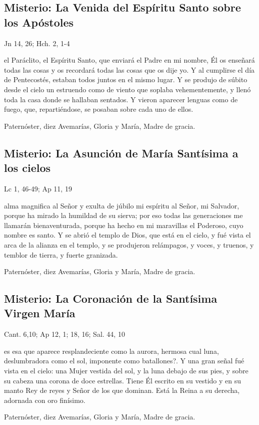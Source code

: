 \documentclass[./main.tex]{subfiles}
\newcounter{glorious-counter}
\begin{document}
\subsection*{ Misterio: La Venida del Espíritu Santo sobre los Apóstoles}
\begin{flushright}
      {\color{red}Jn 14, 26; Hch. 2, 1-4}
\end{flushright}
 el Paráclito, el Espíritu Santo, que enviará el Padre en mi nombre, Él os enseñará todas las cosas y os recordará todas las cosas que os dije yo. 
Y al cumplirse el día de Pentecostés, estaban todos juntos en el mismo lugar. Y se produjo de súbito desde el cielo un estruendo como de viento que soplaba vehementemente, 
y llenó toda la casa donde se hallaban sentados. Y vieron aparecer lenguas como de fuego, que, repartiéndose, se posaban sobre cada uno de ellos.

\begin{center}
      Paternóster, diez Avemarías, Gloria y María, Madre de gracia.
\end{center}

\subsection*{ Misterio: La Asunción de María Santísima a los cielos}
\begin{flushright}
      {\color{red}Lc 1, 46-49; Ap 11, 19}
\end{flushright}
 alma magnifica al Señor y exulta de júbilo mi espíritu al Señor, mi Salvador, porque ha mirado la humildad de su sierva; 
por eso todas las generaciones me llamarán bienaventurada, porque ha hecho en mi maravillas el Poderoso, cuyo nombre es santo. Y se abrió el templo de Dios, que está en el cielo, 
y fué vista el arca de la alianza en el templo, y se produjeron relámpagos, y voces, y truenos, y temblor de tierra, y fuerte granizada.

\begin{center}
      Paternóster, diez Avemarías, Gloria y María, Madre de gracia.
\end{center}

\subsection*{ Misterio: La Coronación de la Santísima Virgen María}
\begin{flushright}
      {\color{red}Cant. 6,10; Ap 12, 1; 18, 16; Sal. 44, 10}
\end{flushright}
 es esa que aparece resplandeciente como la aurora, hermosa cual luna, deslumbradora como el sol, imponente como batallones?. 
Y una gran señal fué vista en el cielo: una Mujer vestida del sol, y la luna debajo de sus  pies, y sobre su cabeza una corona de doce estrellas. 
Tiene Él escrito en su vestido y en su manto Rey de reyes y Señor de los que dominan. Está la Reina a su derecha, adornada con oro finísimo.

\begin{center}
      Paternóster, diez Avemarías, Gloria y María, Madre de gracia.
\end{center}
\end{document}
